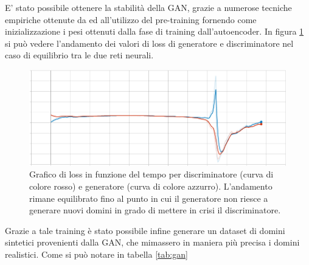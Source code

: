 E' stato possibile ottenere la stabilità della GAN, grazie a numerose tecniche empiriche ottenute da \cite{1606.03498} ed all'utilizzo del pre-training fornendo come inizializzazione i pesi ottenuti dalla fase di training dall'autoencoder. In figura \ref{fig:ganok} si può vedere l'andamento dei valori di loss di generatore e discriminatore nel caso di equilibrio tra le due reti neurali.

\begin{figure}[!bp]
\centering
\includegraphics[width=\columnwidth]{figures/gan/ganok.png}
\caption{Grafico di loss in funzione del tempo per discriminatore (curva di colore rosso) e generatore (curva di colore azzurro). L'andamento rimane equilibrato fino al punto in cui il generatore non riesce a generare nuovi domini in grado di mettere in crisi il discriminatore. \label{fig:ganok}}
\end{figure}

Grazie a tale training è stato possibile infine generare un dataset di domini sintetici provenienti dalla GAN, che mimassero in maniera più precisa i domini realistici. Come si può notare in tabella \ref{tab:gan} 

